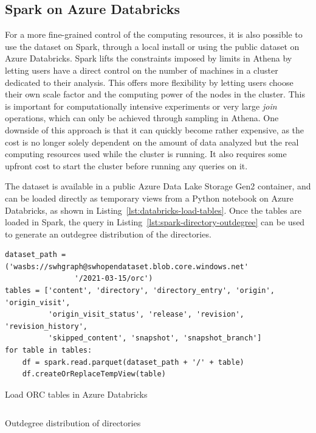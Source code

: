 \subsection{Spark on Azure Databricks}

For a more fine-grained control of the computing resources, it is also possible
to use the dataset on Spark, through a local install or using the public
dataset on Azure Databricks. Spark lifts the constraints imposed by limits in
Athena by letting users have a direct control on the number of machines in a
cluster dedicated to their analysis. This offers more flexibility by letting
users choose their own scale factor and the computing power of the nodes in the
cluster.  This is important for computationally intensive experiments or very
large \emph{join} operations, which can only be achieved through sampling in
Athena. One downside of this approach is that it can quickly become rather
expensive, as the cost is no longer solely dependent on the amount of data
analyzed but the real computing resources used while the cluster is running. It
also requires some upfront cost to start the cluster before running any queries
on it.

The dataset is available in a public Azure Data Lake Storage Gen2 container,
and can be loaded directly as temporary views from a Python notebook on Azure
Databricks, as shown in Listing~\ref{lst:databricks-load-tables}.
Once the tables are loaded in Spark, the query in
Listing~\ref{lst:spark-directory-outdegree} can be used to generate an
outdegree distribution of the directories.

\begin{listing}
\begin{verbatim}
dataset_path = ('wasbs://swhgraph@swhopendataset.blob.core.windows.net'
                '/2021-03-15/orc')
tables = ['content', 'directory', 'directory_entry', 'origin', 'origin_visit',
          'origin_visit_status', 'release', 'revision', 'revision_history',
          'skipped_content', 'snapshot', 'snapshot_branch']
for table in tables:
    df = spark.read.parquet(dataset_path + '/' + table)
    df.createOrReplaceTempView(table)
\end{verbatim}
\caption{Load ORC tables in Azure Databricks}%
\label{lst:databricks-load-tables}
\end{listing}

\begin{listing}
    \inputminted{sql}{codesamples/graph-dataset/spark-degree.sql}
    \caption{Outdegree distribution of directories}%
    \label{lst:spark-directory-outdegree}
\end{listing}

